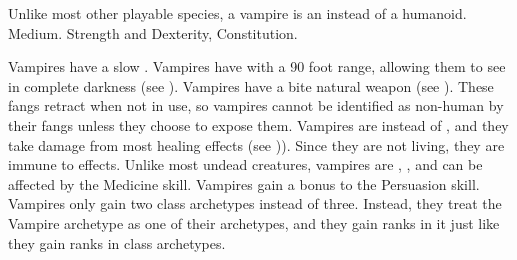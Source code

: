    Unlike most other playable species, a vampire is an   instead of a  humanoid.
   Medium.
    Strength and Dexterity,  Constitution.
  \begin{raggeditemize}
     Vampires have a slow .
     Vampires have  with a 90 foot range, allowing them to see in complete darkness (see ).
     Vampires have a bite natural weapon (see ).
      These fangs retract when not in use, so vampires cannot be identified as non-human by their fangs unless they choose to expose them.
     Vampires are  instead of , and they take damage from most healing effects (see )).
      Since they are not living, they are immune to \atPoison effects.
     Unlike most undead creatures, vampires are , , and can be affected by the Medicine skill. 
     Vampires gain a  bonus to the Persuasion skill.
     Vampires only gain two class archetypes instead of three.
      Instead, they treat the Vampire archetype as one of their archetypes, and they gain ranks in it just like they gain ranks in class archetypes.
  \end{raggeditemize}

